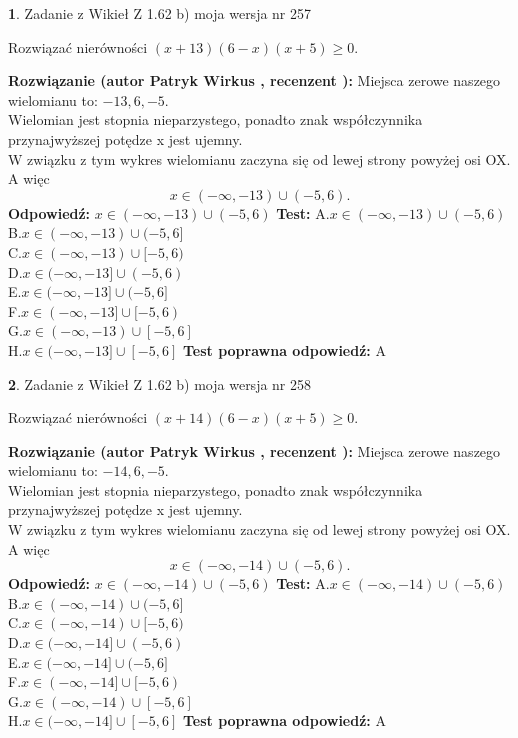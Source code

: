 \documentclass[12pt, a4paper]{article}
\theoremstyle{definition} %
\newtheorem{zad}{}
\newcommand{\zadStart}[1]{\begin{zad}#1\newline}
\newcommand{\zadStop}{\end{zad}}
\newcommand{\rozwStart}[2]{\noindent \textbf{Rozwiązanie (autor #1 , recenzent #2): }\newline}
\newcommand{\rozwStop}{\newline}
\newcommand{\odpStart}{\noindent \textbf{Odpowiedź:}\newline}
\newcommand{\odpStop}{\newline}
\newcommand{\testStart}{\noindent \textbf{Test:}\newline}
\newcommand{\testStop}{\newline}
\newcommand{\kluczStart}{\noindent \textbf{Test poprawna odpowiedź:}\newline}
\newcommand{\kluczStop}{\newline}
\begin{document}
\zadStart{Zadanie z Wikieł Z 1.62 b) moja wersja nr 257}

Rozwiązać nierówności $(x+13)(6-x)(x+5)\ge0$.
\zadStop
\rozwStart{Patryk Wirkus}{}
Miejsca zerowe naszego wielomianu to: $-13, 6, -5$.\\
Wielomian jest stopnia nieparzystego, ponadto znak współczynnika przy\linebreak najwyższej potędze x jest ujemny.\\ W związku z tym wykres wielomianu zaczyna się od lewej strony powyżej osi OX. A więc $$x \in (-\infty,-13) \cup (-5,6).$$
\rozwStop
\odpStart
$x \in (-\infty,-13) \cup (-5,6)$
\odpStop
\testStart
A.$x \in (-\infty,-13) \cup (-5,6)$\\
B.$x \in (-\infty,-13) \cup (-5,6]$\\
C.$x \in (-\infty,-13) \cup [-5,6)$\\
D.$x \in (-\infty,-13] \cup (-5,6)$\\
E.$x \in (-\infty,-13] \cup (-5,6]$\\
F.$x \in (-\infty,-13] \cup [-5,6)$\\
G.$x \in (-\infty,-13) \cup [-5,6]$\\
H.$x \in (-\infty,-13] \cup [-5,6]$
\testStop
\kluczStart
A
\kluczStop



\zadStart{Zadanie z Wikieł Z 1.62 b) moja wersja nr 258}

Rozwiązać nierówności $(x+14)(6-x)(x+5)\ge0$.
\zadStop
\rozwStart{Patryk Wirkus}{}
Miejsca zerowe naszego wielomianu to: $-14, 6, -5$.\\
Wielomian jest stopnia nieparzystego, ponadto znak współczynnika przy\linebreak najwyższej potędze x jest ujemny.\\ W związku z tym wykres wielomianu zaczyna się od lewej strony powyżej osi OX. A więc $$x \in (-\infty,-14) \cup (-5,6).$$
\rozwStop
\odpStart
$x \in (-\infty,-14) \cup (-5,6)$
\odpStop
\testStart
A.$x \in (-\infty,-14) \cup (-5,6)$\\
B.$x \in (-\infty,-14) \cup (-5,6]$\\
C.$x \in (-\infty,-14) \cup [-5,6)$\\
D.$x \in (-\infty,-14] \cup (-5,6)$\\
E.$x \in (-\infty,-14] \cup (-5,6]$\\
F.$x \in (-\infty,-14] \cup [-5,6)$\\
G.$x \in (-\infty,-14) \cup [-5,6]$\\
H.$x \in (-\infty,-14] \cup [-5,6]$
\testStop
\kluczStart
A
\kluczStop
\end{document}
